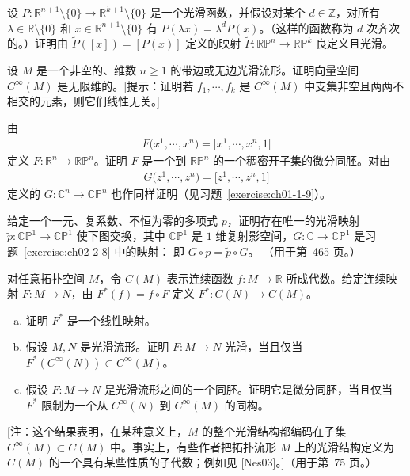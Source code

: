 \documentclass[../../main.tex]{subfiles}
\begin{document}
\begin{exercise}\label{exercise:ch02-2-6}
设 $P:\mathbb{R}^{n+1}\setminus\{0\}\to\mathbb{R}^{k+1}\setminus\{0\}$ 是一个光滑函数，并假设对某个 $d\in\mathbb{Z}$，对所有 $\lambda\in\mathbb{R}\setminus\{0\}$ 和 $x\in\mathbb{R}^{n+1}\setminus\{0\}$ 有 $P(\lambda x)=\lambda^{d}P(x)$。（这样的函数称为 $d$ 次齐次的。）证明由 $\widetilde{P}([x])=[P(x)]$ 定义的映射 $\widetilde{P}:\mathbb{RP}^{n}\to\mathbb{RP}^{k}$ 良定义且光滑。
\end{exercise}

\begin{exercise}\label{exercise:ch02-2-7}
设 $M$ 是一个非空的、维数 $n\geqslant 1$ 的带边或无边光滑流形。证明向量空间 $C^{\infty}(M)$ 是无限维的。[提示：证明若 $f_{1},\cdots ,f_{k}$ 是 $C^{\infty}(M)$ 中支集非空且两两不相交的元素，则它们线性无关。]
\end{exercise}

\begin{exercise}\label{exercise:ch02-2-8}
由
\begin{align*}
F\bigl(x^{1},\cdots ,x^{n}\bigr)=\bigl[x^{1},\cdots ,x^{n},1\bigr]
\end{align*}
定义 $F:\mathbb{R}^{n}\to\mathbb{RP}^{n}$。证明 $F$ 是一个到 $\mathbb{RP}^{n}$ 的一个稠密开子集的微分同胚。对由
\begin{align*}
G\bigl(z^{1},\cdots ,z^{n}\bigr)=\bigl[z^{1},\cdots ,z^{n},1\bigr]
\end{align*}
定义的 $G:\mathbb{C}^{n}\to\mathbb{CP}^{n}$ 也作同样证明（见习题~\cref{exercise:ch01-1-9}）。
\end{exercise}

\begin{exercise}\label{exercise:ch02-2-9}
给定一个一元、复系数、不恒为零的多项式 $p$，证明存在唯一的光滑映射 $\widetilde{p}:\mathbb{CP}^{1}\to\mathbb{CP}^{1}$ 使下图交换，其中 $\mathbb{CP}^{1}$ 是 $1$ 维复射影空间，$G:\mathbb{C}\to\mathbb{CP}^{1}$ 是习题~\cref{exercise:ch02-2-8} 中的映射：
即 $G\circ p=\widetilde{p}\circ G$。
（用于第~465 页。）
\end{exercise}

\begin{exercise}\label{exercise:ch02-2-10}
对任意拓扑空间 $M$，令 $C(M)$ 表示连续函数 $f:M\to\mathbb{R}$ 所成代数。给定连续映射 $F:M\to N$，由 $F^{*}(f)=f\circ F$ 定义 $F^{*}:C(N)\to C(M)$。
\begin{enumerate}[(a)]
\item 证明 $F^{*}$ 是一个线性映射。
\item 假设 $M,N$ 是光滑流形。证明 $F:M\to N$ 光滑，当且仅当 $F^{*}(C^{\infty}(N))\subset C^{\infty}(M)$。
\item 假设 $F:M\to N$ 是光滑流形之间的一个同胚。证明它是微分同胚，当且仅当 $F^{*}$ 限制为一个从 $C^{\infty}(N)$ 到 $C^{\infty}(M)$ 的同构。
\end{enumerate}
[注：这个结果表明，在某种意义上，$M$ 的整个光滑结构都编码在子集 $C^{\infty}(M)\subset C(M)$ 中。事实上，有些作者把拓扑流形 $M$ 上的光滑结构定义为 $C(M)$ 的一个具有某些性质的子代数；例如见 [Nes03]。]（用于第~75 页。）
\end{exercise}
\end{document}

